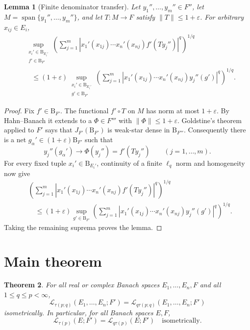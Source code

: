 \documentclass[11pt]{article}
\newtheorem{theorem}{Theorem}
\newtheorem{lemma}[theorem]{Lemma}
\newcommand{\Lop}{\mathcal L}
\newcommand{\B}{\mathrm B}
\begin{document}
\begin{lemma}[Finite denominator transfer]\label{lem:denominator}
Let $y_1'',\ldots,y_m''\in F''$, let
$M=\operatorname{span}\{y_1'',\ldots,y_m''\}$, and let
$T:M\to F$ satisfy $\|T\|\le1+\varepsilon$.  For arbitrary
$x_{ij}\in E_i$,
\begin{align*}
 &\sup_{\substack{x_i'\in\B_{E_i'}\\f'\in\B_{F'}}}
 \left(\sum_{j=1}^m
 |x_1'(x_{1j})\cdots x_n'(x_{nj})f'(Ty_j'')|^q\right)^{1/q}\\
 &\quad\le(1+\varepsilon)
 \sup_{\substack{x_i'\in\B_{E_i'}\\g'\in\B_{F'}}}
 \left(\sum_{j=1}^m
 |x_1'(x_{1j})\cdots x_n'(x_{nj})y_j''(g')|^q\right)^{1/q}.
\end{align*}
\end{lemma}

\begin{proof}
Fix $f'\in\B_{F'}$.  The functional $f'\circ T$ on $M$ has norm at most
$1+\varepsilon$.  By Hahn--Banach it extends to a
$\Phi\in F'''$ with $\|\Phi\|\le1+\varepsilon$.  Goldstine's theorem applied
to $F'$ says that $J_{F'}(\B_{F'})$ is weak-star dense in
$\B_{F'''}$.  Consequently there is a net
$g_\alpha'\in(1+\varepsilon)\B_{F'}$ such that
\[
 y_j''(g_\alpha')\longrightarrow \Phi(y_j'')=f'(Ty_j'')
 \qquad(j=1,\ldots,m).
\]
For every fixed tuple $x_i'\in\B_{E_i'}$, continuity of a finite
$\ell_q$ norm and homogeneity now give
\begin{align*}
 &\left(\sum_{j=1}^m
 |x_1'(x_{1j})\cdots x_n'(x_{nj})f'(Ty_j'')|^q\right)^{1/q}\\
 &\quad\le(1+\varepsilon)
 \sup_{g'\in\B_{F'}}
 \left(\sum_{j=1}^m
 |x_1'(x_{1j})\cdots x_n'(x_{nj})y_j''(g')|^q\right)^{1/q}.
\end{align*}
Taking the remaining suprema proves the lemma.
\end{proof}

\section{Main theorem}

\begin{theorem}\label{thm:main}
For all real or complex Banach spaces $E_1,\ldots,E_n,F$ and all
$1\le q\le p<\infty$,
\[
 \Lop_{\tau(p;q)}(E_1,\ldots,E_n;F')
 =\Lop_{q\tau(p;q)}(E_1,\ldots,E_n;F')
\]
isometrically.  In particular, for all Banach spaces $E,F$,
\[
 \boxed{\ \Lop_{\tau(p)}(E;F')
 =\Lop_{q\tau(p)}(E;F')\quad\text{isometrically}.\ }
\]
\end{theorem}
\end{document}
